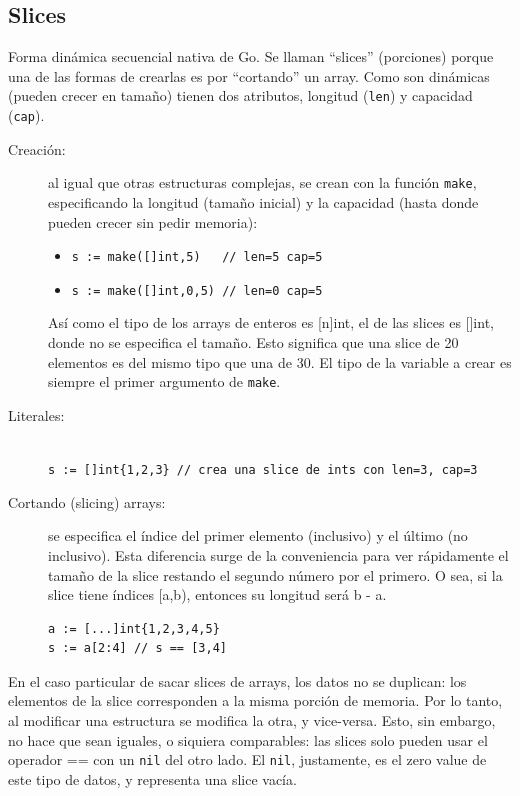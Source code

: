 \documentclass{article}
\begin{document}
\subsection{Slices}
Forma dinámica secuencial nativa de Go. Se llaman ``slices'' (porciones) porque una de las formas de crearlas es por ``cortando'' un array. Como son dinámicas (pueden crecer en tamaño) tienen dos atributos, longitud (\lstinline|len|) y capacidad (\lstinline|cap|). %
\begin{description}
	\item[Creación:] al igual que otras estructuras complejas, se crean con la función \lstinline|make|, especificando la longitud (tamaño inicial) y la capacidad (hasta donde pueden crecer sin pedir memoria):
	\begin{itemize}
		\item \lstinline|s := make([]int,5)   // len=5 cap=5|
		\item \lstinline|s := make([]int,0,5) // len=0 cap=5|
	\end{itemize}
	Así como el tipo de los arrays de enteros es [n]int, el de las slices es []int, donde no se especifica el tamaño. Esto significa que una slice de 20 elementos es del mismo tipo que una de 30. El tipo de la variable a crear es siempre el primer argumento de \lstinline|make|.
	\item[Literales:] \hfill \\
		\lstinline|s := []int{1,2,3} // crea una slice de ints con len=3, cap=3|
	\item[Cortando (slicing) arrays:] se especifica el índice del primer elemento (inclusivo) y el último (no inclusivo). Esta diferencia surge de la conveniencia para ver rápidamente el tamaño de la slice restando el segundo número por el primero. O sea, si la slice tiene índices [a,b), entonces su longitud será b - a.
\begin{lstlisting}[caption = slices desde arrays]
a := [...]int{1,2,3,4,5}
s := a[2:4] // s == [3,4]
\end{lstlisting}	
\end{description}

En el caso particular de sacar slices de arrays, los datos no se duplican: los elementos de la slice corresponden a la misma porción de memoria\cite{slices}. Por lo tanto, al modificar una estructura se modifica la otra, y vice-versa. Esto, sin embargo, no hace que sean iguales, o siquiera comparables: las slices solo pueden usar el operador == con un \lstinline|nil| del otro lado. El \lstinline|nil|, justamente, es el zero value de este tipo de datos, y representa una slice vacía.
\end{document}
